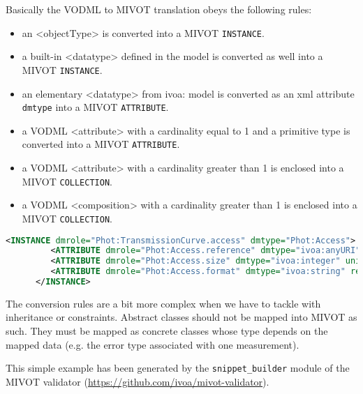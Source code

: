 Basically the VODML to MIVOT translation obeys the following rules:
\begin{itemize}
    \item an <objectType> is converted into a MIVOT \texttt{INSTANCE}. 
    \item a built-in <datatype> defined in the model is converted as well into a MIVOT \texttt{INSTANCE}. 
    \item an elementary <datatype> from ivoa: model is converted as an xml attribute \texttt{dmtype} into a MIVOT \texttt{ATTRIBUTE}. 
    \item a VODML <attribute> with a cardinality equal to 1 and a primitive type 
          is converted into a MIVOT \texttt{ATTRIBUTE}. 
    \item a VODML <attribute> with a cardinality greater than 1 is enclosed into a MIVOT \texttt{COLLECTION}. 
    \item a VODML <composition> with a cardinality greater than 1 is enclosed into a MIVOT \texttt{COLLECTION}.     
\end{itemize} 

\begin{lstlisting}[caption={MIVOT instanciation of the PhotDM class \texttt{Access}. 
VODML attributes are mapped as simple \texttt{ATTRIBUTE}s since their cardinality is equal to 
1 and they have primitive types. In this example, automatically 
generated, \texttt{ATTRIBUTE}s come with both \texttt{@ref} and \texttt{@value}. Using one, the other or both 
depends on the actual data being annotated (see \ref{ATTRIBUTE}). 
The cryptic  "@@@@@" label indicates a place holder. It must be replaced with the 
 actual \texttt{FIELD} name of the TABLE column below matching the ATTRIBUTE values in the model.
},language=XML]
      <INSTANCE dmrole="Phot:TransmissionCurve.access" dmtype="Phot:Access">
         <ATTRIBUTE dmrole="Phot:Access.reference" dmtype="ivoa:anyURI" ref="@@@@@" value=""/>
         <ATTRIBUTE dmrole="Phot:Access.size" dmtype="ivoa:integer" unit="" ref="@@@@@" value=""/>
         <ATTRIBUTE dmrole="Phot:Access.format" dmtype="ivoa:string" ref="@@@@@" value=""/>
      </INSTANCE>
\end{lstlisting}  

The conversion rules are a bit more complex when we have to tackle with inheritance or constraints.
Abstract classes should not be mapped into MIVOT as such. They must be mapped as concrete classes 
whose type depends on the mapped data (e.g. the error type associated with one measurement).

This simple example has been generated by the \texttt{snippet\_builder} module of the MIVOT validator 
(\url{https://github.com/ivoa/mivot-validator}).

